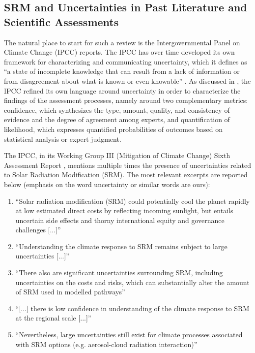 \documentclass[draft]{agujournal2019}
\begin{document}
\subsection{SRM and Uncertainties in Past Literature and Scientific Assessments}

The natural place to start for such a review is the Intergovernmental Panel on Climate Change (IPCC) reports. The IPCC has over time developed its own framework for characterizing and communicating uncertainty, which it defines as ``a state of incomplete knowledge that can result from a lack of information or from disagreement about what is known or even knowable'' \cite{IPCC_2013_WGI_SPM}. As discussed in , the IPCC refined its own language around uncertainty in order to characterize the findings of the assessment processes, namely around two complementary metrics: confidence, which synthesizes the type, amount, quality, and consistency of evidence and the degree of agreement among experts, and quantification of likelihood, which expresses quantified probabilities of outcomes based on statistical analysis or expert judgment.

The IPCC, in its Working Group III (Mitigation of Climate Change) Sixth Assessment Report \cite{IPCC_2022_WGIII}, mentions multiple times the presence of uncertainties related to Solar Radiation Modification (SRM). The most relevant excerpts are reported below (emphasis on the word uncertainty or similar words are ours):

\begin{enumerate}
    \item ``Solar radiation modification (SRM) could potentially cool the planet rapidly at low estimated direct costs by reflecting incoming sunlight, but entails uncertain side effects and thorny international equity and governance challenges [...]''
    \item ``Understanding the climate response to SRM remains subject to large uncertainties [...]''
    \item ``There also are significant uncertainties surrounding SRM, including uncertainties on the costs and risks, which can substantially alter the amount of SRM used in modelled pathways''
    \item ``[...] there is low confidence in understanding of the climate response to SRM at the regional scale [...]''
    \item ``Nevertheless, large uncertainties still exist for climate processes associated with SRM options (e.g. aerosol-cloud radiation interaction)''
\end{enumerate}
\end{document}

